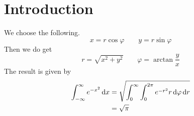 \documentclass[crop=false]{standalone}
\begin{document}
  \section{Introduction}
    We choose the following.
    \[
      x = r \cos \varphi
      \qquad
      y = r \sin \varphi
    \]
    Then we do get
    \[
      r = \sqrt{x^2 + y^2}
      \qquad
      \varphi = \arctan{\frac{y}{x}}
    \]
    The result is given by
    \begin{align*}
      \int_{-\infty}^{\infty} e^{-x^2}\, \mathrm{d}x
      &= \sqrt{ \int_{0}^{\infty}  \int_{0}^{2\pi}  e^{-r^2} r \, \mathrm{d}\varphi \, \mathrm{d}r } \\
      &= \sqrt{\pi}
    \end{align*}
\end{document}
